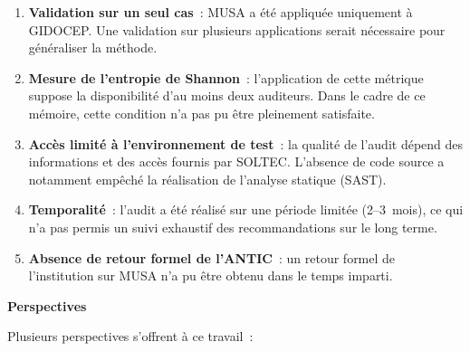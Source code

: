 \documentclass[12pt,a4paper,oneside]{report}
\begin{document}
\begin{enumerate}[label={\color{gold}\theenumi.}, leftmargin=*]
	\item \textbf{Validation sur un seul cas}~: MUSA a été appliquée
	uniquement à GIDOCEP. Une validation sur plusieurs applications
	serait nécessaire pour généraliser la méthode.
	
	\item \textbf{Mesure de l'entropie de Shannon}~: l'application de
	cette métrique suppose la disponibilité d'au moins deux auditeurs.
	Dans le cadre de ce mémoire, cette condition n'a pas pu être
	pleinement satisfaite.
	
	\item \textbf{Accès limité à l'environnement de test}~: la qualité
	de l'audit dépend des informations et des accès fournis par SOLTEC.
	L'absence de code source a notamment empêché la réalisation de
	l'analyse statique (SAST).
	
	\item \textbf{Temporalité}~: l'audit a été réalisé sur une période
	limitée (2--3~mois), ce qui n'a pas permis un suivi exhaustif
	des recommandations sur le long terme.
	
	\item \textbf{Absence de retour formel de l'ANTIC}~: un retour formel
	de l'institution sur MUSA n'a pu être obtenu dans le temps imparti.
\end{enumerate}

\medskip

\noindent\textbf{Perspectives}

Plusieurs perspectives s'offrent à ce travail~:
\end{document}
